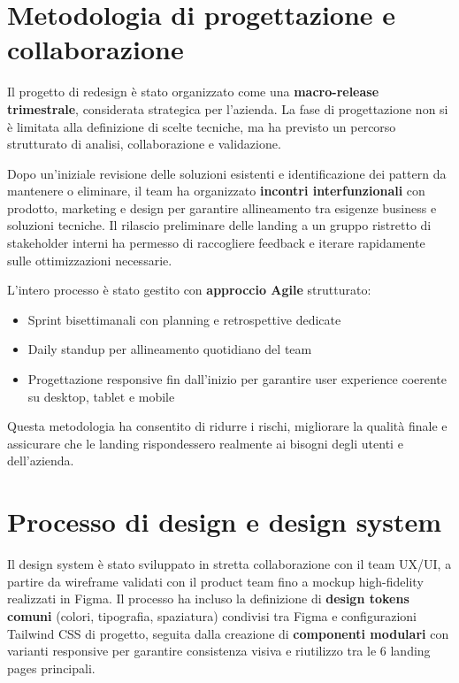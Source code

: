 \section{Metodologia di progettazione e collaborazione}
Il progetto di redesign è stato organizzato come una \textbf{macro-release trimestrale},
considerata strategica per l'azienda. La fase di progettazione non si è limitata
alla definizione di scelte tecniche, ma ha previsto un percorso strutturato di
analisi, collaborazione e validazione.

Dopo un'iniziale revisione delle soluzioni esistenti e identificazione dei 
pattern da mantenere o eliminare, il team ha organizzato \textbf{incontri 
interfunzionali} con prodotto, marketing e design per garantire allineamento 
tra esigenze business e soluzioni tecniche. Il rilascio preliminare delle 
landing a un gruppo ristretto di stakeholder interni ha permesso di raccogliere 
feedback e iterare rapidamente sulle ottimizzazioni necessarie.

L'intero processo è stato gestito con \textbf{approccio Agile} strutturato:

\begin{itemize}
  \item Sprint bisettimanali con planning e retrospettive dedicate
  \item Daily standup per allineamento quotidiano del team
  \item Progettazione responsive fin dall'inizio per garantire user experience 
        coerente su desktop, tablet e mobile
\end{itemize}

Questa metodologia ha consentito di ridurre i rischi, migliorare la qualità
finale e assicurare che le landing rispondessero realmente ai bisogni degli utenti
e dell'azienda.

\section{Processo di design e design system}
Il design system è stato sviluppato in stretta collaborazione con il team UX/UI,
a partire da wireframe validati con il product team fino a mockup
high-fidelity realizzati in Figma. Il processo ha incluso la definizione di 
\textbf{design tokens comuni} (colori, tipografia, spaziatura) condivisi tra 
Figma e configurazioni Tailwind CSS di progetto, seguita dalla creazione di 
\textbf{componenti modulari} con varianti responsive per garantire consistenza 
visiva e riutilizzo tra le 6 landing pages principali.

